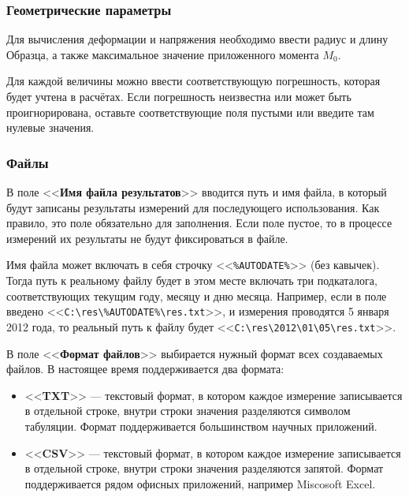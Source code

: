 \documentclass[12pt, a4paper, twocolumn]{book}
\newcommand{\CTL}[1]{<<{\bf #1}>>}
\newcommand{\CMD}[1]{<<{\tt #1}>>}
\begin{document}
\subsubsection{Геометрические параметры}
\label{sec_geom_params}

Для вычисления деформации и напряжения необходимо ввести радиус и длину Образца, а также максимальное значение приложенного момента $M_0$.

Для каждой величины можно ввести соответствующую погрешность, которая будет учтена в расчётах. Если погрешность неизвестна или может быть проигнорирована, оставьте соответствующие поля пустыми или введите там нулевые значения.

\subsubsection{Файлы}

В поле \CTL{Имя файла результатов} вводится путь и имя файла, в который будут записаны результаты измерений для последующего использования. Как правило, это поле обязательно для заполнения. Если поле пустое, то в процессе измерений их результаты не будут фиксироваться в файле.

Имя файла может включать в себя строчку \CMD{\%AUTODATE\%} (без кавычек). Тогда путь к реальному файлу будет в этом месте включать три
 подкаталога, соответствующих текущим году, месяцу и дню месяца. Например, если в поле введено \CMD{C:\textbackslash{}res\textbackslash{}\%AUTODATE\%\textbackslash{}res.txt}, и измерения проводятся 5 января 2012 года, то реальный путь к файлу будет \CMD{C:\textbackslash{}res\textbackslash{}2012\textbackslash{}01\textbackslash{}05\textbackslash{}res.txt}.

В поле \CTL{Формат файлов} выбирается нужный формат всех создаваемых файлов. В настоящее время поддерживается два формата:

\begin{itemize}
\item \CTL{TXT} --- текстовый формат, в котором каждое измерение записывается в отдельной строке, внутри строки значения разделяются символом табуляции. Формат поддерживается большинством научных приложений.
\item \CTL{CSV} --- текстовый формат, в котором каждое измерение записывается в отдельной строке, внутри строки значения разделяются запятой. Формат поддерживается рядом офисных приложений, например Miscosoft Excel.
\end{itemize}
\end{document}
